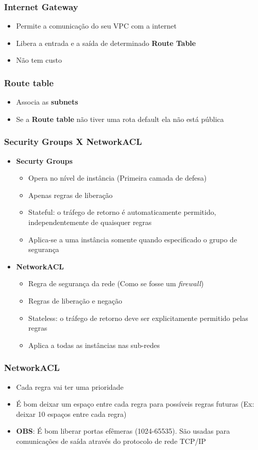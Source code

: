 \begin{frame}
	\frametitle{Internet Gateway}
	\begin{itemize}
		\item Permite a comunicação do seu VPC com a internet
		\item Libera a entrada e a saída de determinado \textbf{Route Table}
		\item Não tem custo
	\end{itemize}
\end{frame}

\begin{frame}
	\frametitle{Route table}
	\begin{itemize}
		\item Associa as \textbf{subnets}
		\item Se a \textbf{Route table} não tiver uma rota default ela não está pública
	\end{itemize}
\end{frame}

\begin{frame}
	\frametitle{Security Groups X NetworkACL}
	\begin{itemize}
		\item \textbf{Securty Groups}
		\begin{itemize}
			\item Opera no nível de instância (Primeira camada de defesa)
			\item Apenas regras de liberação
			\item Stateful: o tráfego de retorno é automaticamente permitido, independentemente de quaisquer regras
			\item Aplica-se a uma instância somente quando especificado o grupo de segurança
		\end{itemize}
		\item \textbf{NetworkACL}
		\begin{itemize}
			\item Regra de segurança da rede (Como se fosse um \textit{firewall})
			\item Regras de liberação e negação
			\item Stateless: o tráfego de retorno deve ser explicitamente permitido pelas regras
			\item Aplica a todas as instâncias nas sub-redes
		\end{itemize}
	\end{itemize}
\end{frame}

\begin{frame}
	\frametitle{NetworkACL}
	\begin{itemize}
		\item Cada regra vai ter uma prioridade
		\item É bom deixar um espaço entre cada regra para possíveis regras futuras (Ex: deixar 10 espaços entre cada regra)
		\item \textbf{OBS}: É bom liberar portas efêmeras (1024-65535). São usadas para comunicações de saída através do protocolo de rede TCP/IP
	\end{itemize}
\end{frame}

